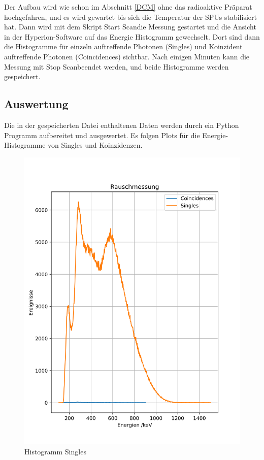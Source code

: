 \documentclass[12pt,twoside,a4paper]{scrartcl}
\begin{document}
		Der Aufbau wird wie schon im Abschnitt \ref{DCM} ohne das radioaktive Präparat hochgefahren, und es wird gewartet bis sich die Temperatur der SPUs stabilisiert hat.
		Dann wird mit dem Skript \glqq Start Scan\grqq die Messung gestartet und die Ansicht in der Hyperion-Software auf das Energie Histogramm gewechselt. Dort sind dann die Histogramme für einzeln auftreffende Photonen (Singles) und Koinzident auftreffende Photonen (Coincidences) sichtbar. Nach einigen Minuten kann die Messung mit \glqq Stop Scan\grqq beendet werden, und beide Histogramme werden gespeichert.

		\subsection{Auswertung}

		Die in der gespeicherten Datei enthaltenen Daten werden durch ein Python Programm aufbereitet und ausgewertet.
		Es folgen Plots für die Energie-Histogramme von Singles und Koinzidenzen.

			\begin{figure}[H]
				\centering
				\includegraphics[width=0.9 \textwidth]{Plots/rausch}
				\caption{Histogramm Singles}
		\end{figure}
\end{document}

